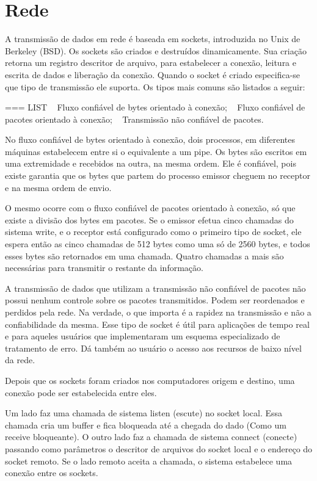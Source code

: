 \section{Rede}

A transmissão de dados em rede é baseada em sockets, introduzida no Unix de Berkeley (BSD). Os sockets são criados e destruídos dinamicamente. Sua criação retorna um registro descritor de arquivo, para estabelecer a conexão, leitura e escrita de dados e liberação da conexão. Quando o socket é criado especifica-se que tipo de transmissão ele suporta. Os tipos mais comuns são listados a seguir:

=== LIST
Fluxo confiável de bytes orientado à conexão;
Fluxo confiável de pacotes orientado à conexão;
Transmissão não confiável de pacotes.

No fluxo confiável de bytes orientado à conexão, dois processos, em diferentes máquinas estabelecem entre si o equivalente a um pipe. Os bytes são escritos em uma extremidade e recebidos na outra, na mesma ordem. Ele é confiável, pois existe garantia que os bytes que partem do processo emissor cheguem no receptor e na mesma ordem de envio.

O mesmo ocorre com o fluxo confiável de pacotes orientado à conexão, só que existe a divisão dos bytes em pacotes. Se o emissor efetua cinco chamadas do sistema write, e o receptor está configurado como o primeiro tipo de socket, ele espera então as cinco chamadas de 512 bytes como uma só de 2560 bytes, e todos esses bytes são retornados em uma chamada. Quatro chamadas a mais são necessárias para transmitir o restante da informação.

A transmissão de dados que utilizam a transmissão não confiável de pacotes não possui nenhum controle sobre os pacotes transmitidos. Podem ser reordenados e perdidos pela rede. Na verdade, o que importa é a rapidez na transmissão e não a confiabilidade da mesma. Esse tipo de socket é útil para aplicações de tempo real e para aqueles usuários que implementaram um esquema especializado de tratamento de erro. Dá também ao usuário o acesso aos recursos de baixo nível da rede.

Depois que os sockets foram criados nos computadores origem e destino, uma conexão pode ser estabelecida entre eles.

Um lado faz uma chamada de sistema listen (escute) no socket local. Essa chamada cria um buffer e fica bloqueada até a chegada do dado (Como um receive bloqueante). O outro lado faz a chamada de sistema connect (conecte) passando como parâmetros o descritor de arquivos do socket local e o endereço do socket remoto. Se o lado remoto aceita a chamada, o sistema estabelece uma conexão entre os sockets.


